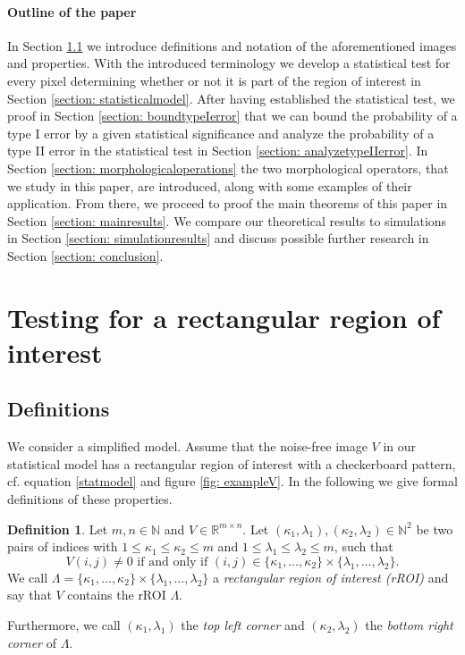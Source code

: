 \documentclass[a4paper,12pt]{article}
\theoremstyle{plain}
\theoremstyle{definition}
\newtheorem{definition}[theorem]{Definition}
\begin{document}
\paragraph{Outline of the paper}

In Section \ref{section: definitions} we introduce definitions and notation of the aforementioned images and properties. With the introduced terminology we develop a statistical test for every pixel determining whether or not it is part of the region of interest in Section \ref{section: statisticalmodel}. After having established the statistical test, we proof in Section \ref{section: boundtypeIerror} that we can bound the probability of a type I error by a given statistical significance and analyze the probability of a type II error in the statistical test in Section \ref{section: analyzetypeIIerror}. In Section \ref{section: morphologicaloperations} the two morphological operators, that we study in this paper, are introduced, along with some examples of their application. From there, we proceed to proof the main theorems of this paper in Section \ref{section: mainresults}. We compare our theoretical results to simulations in Section \ref{section: simulationresults} and discuss possible further research in Section \ref{section: conclusion}.

\newpage

\section{Testing for a rectangular region of interest}

\subsection{Definitions}\label{section: definitions}

We consider a simplified model. Assume that the noise-free image $V$ in our statistical model has a rectangular region of interest with a checkerboard pattern, cf. equation \eqref{statmodel} and figure \ref{fig: exampleV}. In the following we give formal definitions of these properties.

\begin{definition}
	Let $m, n \in \mathbb{N}$ and $V \in \mathbb{R}^{m \times n}$. Let $(\kappa_1, \lambda_1), (\kappa_2, \lambda_2) \in \mathbb{N}^2$ be two pairs of indices with $1 \leq \kappa_1 \leq \kappa_2 \leq m$ and $1 \leq \lambda_1 \leq \lambda_2 \leq m$, such that
	\begin{equation}\label{def: rROI}
		V(i, j) \neq 0 \textrm{ if and only if } (i, j) \in \{ \kappa_1, \dots, \kappa_2 \} \times \{ \lambda_1, \dots, \lambda_2 \}.
	\end{equation}
	We call $\varLambda = \{ \kappa_1, \dots, \kappa_2 \} \times \{ \lambda_1, \dots, \lambda_2 \}$ a \emph{rectangular region of interest (rROI)} and say that $V$ contains the rROI $\varLambda$.
	
	Furthermore, we call $(\kappa_1, \lambda_1)$ the \emph{top left corner} and $(\kappa_2, \lambda_2)$ the \emph{bottom right corner} of $\varLambda$.
\end{definition}
\end{document}
